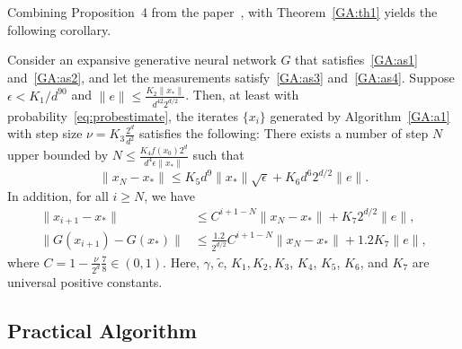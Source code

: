 Combining Proposition~4 from the paper~\cite[Proposition~4]{HV17}, with Theorem~\ref{GA:th1} yields the following corollary.

\begin{corollary}
Consider an expansive generative neural network $G$ that satisfies~\ref{GA:as1} and~\ref{GA:as2}, and let the measurements satisfy~\ref{GA:as3} and~\ref{GA:as4}.
Suppose $\epsilon < K_1 / d^{90}$ and
$\|e\| \leq \frac{K_2 \|x_*\|}{d^{42} 2^{d/2}}$.
Then, at least with probability~\eqref{eq:probestimate}, the iterates $\{x_i\}$ generated by Algorithm~\ref{GA:a1} with step size $\nu = K_3 \frac{2^d}{d^2}$ satisfies the following:
There exists a number of step $N$ upper bounded by $N \leq \frac{K_4 f(x_0) 2^d}{d^4 \epsilon \|x_*\|}$ such that
\[
\|x_N - x_*\| \leq K_5 d^9 \|x_*\| \sqrt{\epsilon} + K_6 d^6 2^{d/2} \|e\|.
\]
In addition, for all $i \geq N$, we have
\begin{align*}
\|x_{i + 1} - x_*\| &\leq C^{i + 1 - N} \|x_N - x_*\| + K_7 2^{d/2} \|e\|, \\
\|G(x_{i + 1}) - G(x_*)\| &\leq \frac{1.2}{2^{d/2}} C^{i + 1 - N} \|x_N - x_*\| + 1.2 K_7 \|e\|,
\end{align*}
where $C = 1 - \frac{\nu}{2^d} \frac{7}{8} \in (0, 1)$.
Here, $\gamma$, $\tilde{c}$, $K_1, K_2, K_3$, $K_4$, $K_5$, $K_6$, and $K_7$ are universal positive constants.
\end{corollary}

\subsection{Practical Algorithm}

